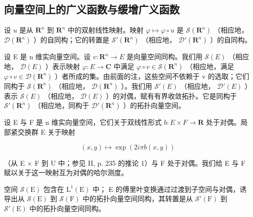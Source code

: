 \subsection{向量空间上的广义函数与缓增广义函数}

设 \(u\) 是从 \(\mathbf{R}^{n}\) 到 \(\mathbf{R}^{n}\) 中的双射线性映射。映射 \(\varphi \mapsto \varphi \circ u\) 是 \(\mathcal{S}(\mathbf{R}^{n})\) （相应地， \(\mathcal{D}(\mathbf{R}^{n})\) ）的自同构；它的转置是 \(\mathcal{S}'(\mathbf{R}^{n})\) （相应地， \(\mathcal{D}'(\mathbf{R}^{n})\) ）的自同构。

设 E 是 n 维实向量空间。设 \(v: \mathbf{R}^{n} \to E\) 是向量空间同构。我们用 \(\mathcal{S}(E)\) （相应地， \(\mathcal{D}(E)\) ）表示映射 \(\varphi: E \to \mathbf{C}\) 中满足 \(\varphi \circ v \in \mathcal{S}(\mathbf{R}^{n})\) （相应地，满足 \(\varphi \circ v \in \mathcal{D}(\mathbf{R}^{n})\) ）者所成的集。由前面的注，这些空间不依赖于 v 的选取；它们同构于 \(\mathcal{S}(\mathbf{R}^{n})\) （相应地， \(\mathcal{D}(\mathbf{R}^{n})\) ）。我们用 \(\mathcal{S}'(E)\) （相应地， \(\mathcal{D}'(E)\) ）表示 \(\mathcal{S}(E)\) （相应地， \(\mathcal{D}(E)\) ）的对偶，赋有有界收敛拓扑。它是同构于 \(\mathcal{S}'(\mathbf{R}^{n})\) （相应地，同构于 \(\mathcal{D}'(\mathbf{R}^{n})\) ）的拓扑向量空间。

设 E 与 F 是 n 维实向量空间，它们关于双线性形式 \(b: E \times F \to \mathbf{R}\) 处于对偶。局部紧交换群 E 关于映射 

\[
(x, y) \mapsto \exp (2 i \pi b (x, y))
\]

（从 E × F 到 U 中；参见 II, p. 235 的推论 1）与 F 处于对偶。我们给 E 与 F 赋以关于这一映射互为对偶的哈尔测度。

空间 \(\mathcal{S}(\mathrm{E})\) 包含在 \(\mathrm{L}^1 (\mathrm{E})\) 中； E 的傅里叶变换通过过渡到子空间与对偶，诱导出从 \(\mathcal{S}(\mathrm{E})\) 到 \(\mathcal{S}(\mathrm{F})\) 中的拓扑向量空间同构，其转置是从 \(\mathcal{S}'(\mathrm{F})\) 到 \(\mathcal{S}'(\mathrm{E})\) 中的拓扑向量空间同构。

